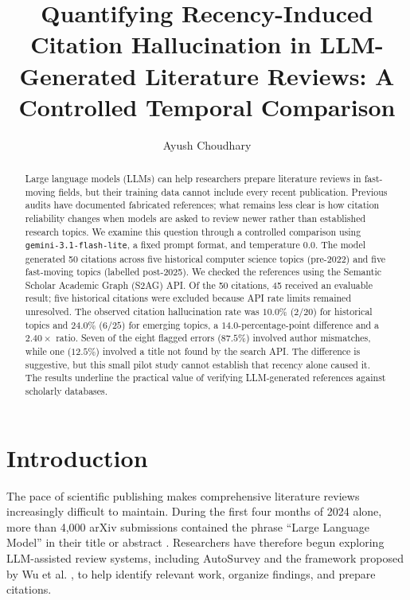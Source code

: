 \documentclass[manuscript,screen]{acmart}
\begin{document}
\title{Quantifying Recency-Induced Citation Hallucination in LLM-Generated Literature Reviews: A Controlled Temporal Comparison}

\author{Ayush Choudhary}

\begin{abstract}
Large language models (LLMs) can help researchers prepare literature reviews in fast-moving fields, but their training data cannot include every recent publication. Previous audits have documented fabricated references; what remains less clear is how citation reliability changes when models are asked to review newer rather than established research topics. We examine this question through a controlled comparison using \texttt{gemini-3.1-flash-lite}, a fixed prompt format, and temperature $0.0$. The model generated 50 citations across five historical computer science topics (pre-2022) and five fast-moving topics (labelled post-2025). We checked the references using the Semantic Scholar Academic Graph (S2AG) API. Of the 50 citations, 45 received an evaluable result; five historical citations were excluded because API rate limits remained unresolved. The observed citation hallucination rate was $10.0\%$ ($2/20$) for historical topics and $24.0\%$ ($6/25$) for emerging topics, a $14.0$-percentage-point difference and a $2.40\times$ ratio. Seven of the eight flagged errors ($87.5\%$) involved author mismatches, while one ($12.5\%$) involved a title not found by the search API. The difference is suggestive, but this small pilot study cannot establish that recency alone caused it. The results underline the practical value of verifying LLM-generated references against scholarly databases.
\end{abstract}

\maketitle



\section{Introduction}
The pace of scientific publishing makes comprehensive literature reviews increasingly difficult to maintain. During the first four months of 2024 alone, more than 4,000 arXiv submissions contained the phrase ``Large Language Model'' in their title or abstract \cite{wang2024autosurvey}. Researchers have therefore begun exploring LLM-assisted review systems, including AutoSurvey \cite{wang2024autosurvey} and the framework proposed by Wu et al. \cite{wu2025automated}, to help identify relevant work, organize findings, and prepare citations.
\end{document}
